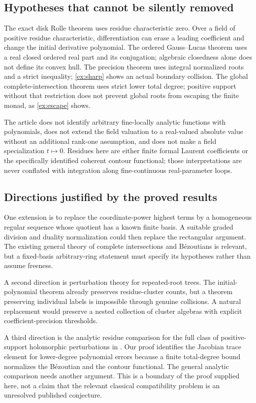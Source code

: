 \documentclass[11pt,letterpaper,oneside]{article}
\numberwithin{equation}{section}
\theoremstyle{definition}
\theoremstyle{remark}\newtheorem{remark}[theorem]{Remark}
\begin{document}
\subsection{Hypotheses that cannot be silently removed}
The exact disk Rolle theorem uses residue characteristic zero. Over a
field of positive residue characteristic, differentiation can erase a
leading coefficient and change the initial derivative polynomial.
The ordered Gauss--Lucas theorem uses a real closed ordered real part
and its conjugation; algebraic closedness alone does not define its convex
hull. The precision theorem uses integral normalized roots and a strict
inequality; \cref{ex:sharp} shows an actual boundary collision.
The global complete-intersection theorem uses strict lower total degree;
positive support without that restriction does not prevent global roots
from escaping the finite monad, as \cref{ex:escape} shows.

The article does not identify arbitrary fine-locally analytic functions
with polynomials, does not extend the field valuation to a real-valued
absolute value without an additional rank-one assumption, and does not
make a field specialization $t\mapsto0$. Residues here are either finite
formal Laurent coefficients or the specifically identified coherent
contour functional; those interpretations are never conflated with
integration along fine-continuous real-parameter loops.

\subsection{Directions justified by the proved results}
One extension is to replace the coordinate-power highest terms by a
homogeneous regular sequence whose quotient has a known finite basis.
A suitable graded division and duality normalization could then replace
the rectangular argument. The existing general theory of complete
intersections and B\'ezoutians is relevant, but a fixed-basis arbitrary-ring
statement must specify its hypotheses rather than assume freeness.

A second direction is perturbation theory for repeated-root trees.
The initial-polynomial theorem already preserves residue-cluster counts,
but a theorem preserving individual labels is impossible through genuine
collisions. A natural replacement would preserve a nested collection of
cluster algebras with explicit coefficient-precision thresholds.

A third direction is the analytic residue comparison for the full class
of positive-support holomorphic perturbations in \cite{SourceResearch}.
Our proof identifies the Jacobian trace element for lower-degree
polynomial errors because a finite total-degree bound normalizes the
B\'ezoutian and the contour functional. The general analytic comparison
needs another argument. This is a boundary of the proof supplied here,
not a claim that the relevant classical compatibility problem is an
unresolved published conjecture.
\end{document}
